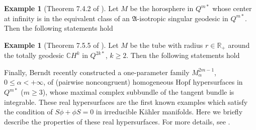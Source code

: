 \documentclass[reqno]{amsart}%
\theoremstyle{definition}
\newtheorem{example}[theorem]{Example}
\numberwithin{equation}{section}
\begin{document}
\begin{example}[Theorem 7.4.2 of \cite{BS-2022}]\label{ex:3.4}
Let $M$ be the horosphere in $Q^{m*}$ whose center at infinity is in the equivalent class
of an $\mathfrak{A}$-isotropic singular geodesic in $Q^{m*}$. Then the following statements hold
%
\end{example}


\begin{example}[Theorem 7.5.5 of \cite{BS-2022}]\label{ex:3.5}
Let $M$ be the tube with radius $r\in \mathbb{R}_+$ around the totally geodesic $\mathbb{C}H^k$ in $Q^{2k*}$,
$k\geq2$. Then the following statements hold
%
\end{example}

Finally, Berndt \cite{B-2023} recently constructed a one-parameter family
$M_{\alpha}^{2m-1}$, $0\leq\alpha<+\infty$, of (pairwise noncongruent)
homogeneous Hopf hypersurfaces in $Q^{m*}$ ($m\geq3$), whose maximal complex subbundle of the
tangent bundle is integrable. These real hypersurfaces are the first known examples which satisfy the condition of $S\phi+\phi S=0$ in irreducible K\"ahler manifolds. Here we briefly describe the properties of these real hypersurfaces. For more details, see \cite{B-2023}.
\end{document}
